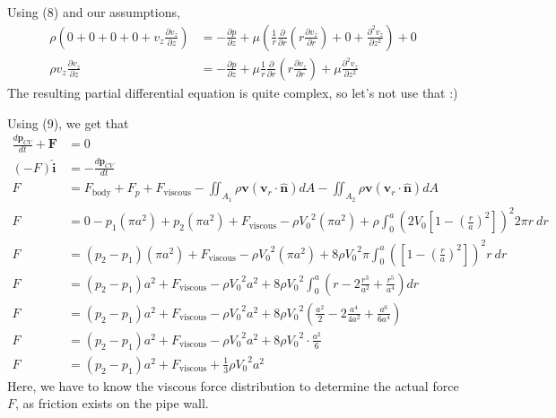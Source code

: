 \documentclass[10pt]{article}
\begin{document}
Using (8) and our assumptions,
\begin{align*}
    \rho\left(0 + 0 + 0 + 0 + v_z \frac{\partial v_z}{\partial z}\right) &= -\frac{\partial p}{\partial z} + \mu \left(\frac{1}{r} \frac{\partial}{\partial r} \left(r \frac{\partial v_z}{\partial r}\right) + 0 + \frac{\partial^2 v_z}{\partial z^2}\right) + 0 \\
    \rho v_z \frac{\partial v_z}{\partial z} &= -\frac{\partial p}{\partial z} + \mu \frac{1}{r} \frac{\partial}{\partial r} \left(r \frac{\partial v_z}{\partial r}\right) + \mu \frac{\partial^2 v_z}{\partial z^2}
\end{align*}
The resulting partial differential equation is quite complex, so let's not use that :)

Using (9), we get that
\begin{align*}
    \frac{d \mathbf{p}_{CV}}{dt} + \mathbf{F} &= 0 \\
    (-F)\mathbf{\hat{i}} &= -\frac{d \mathbf{p}_{CV}}{dt} \\
    F &= F_{\textrm{body}} + F_{p} + F_{\textrm{viscous}} -\iint_{A_{1}} \rho \mathbf{v}\left(\mathbf{v}_r \cdot \mathbf{\hat{n}}\right) dA -\iint_{A_{2}} \rho \mathbf{v}\left(\mathbf{v}_r \cdot \mathbf{\hat{n}}\right) dA \\
    F &= 0 - p_1 \left(\pi a^2\right) + p_2 \left(\pi a^2\right) + F_{\textrm{viscous}} - \rho {V_0}^2 \left(\pi a^2\right) + \rho \int_0^a \left(2V_0 \left[1 - \left(\frac{r}{a}\right)^2\right]\right)^2 2\pi r\ dr \\
    F &= \left(p_2 - p_1\right) \left(\pi a^2\right) + F_{\textrm{viscous}} - \rho {V_0}^2 \left(\pi a^2\right) + 8\rho {V_0}^2 \pi\int_0^a \left(\left[1 - \left(\frac{r}{a}\right)^2\right]\right)^2 r\ dr \\
    F &= \left(p_2 - p_1\right) a^2 + F_{\textrm{viscous}} - \rho {V_0}^2 a^2 + 8\rho {V_0}^2 \int_0^a \left(r - 2 \frac{r^3}{a^2} + \frac{r^5}{a^4}\right) dr \\
    F &= \left(p_2 - p_1\right) a^2 + F_{\textrm{viscous}} - \rho {V_0}^2 a^2 + 8\rho {V_0}^2 \left(\frac{a^2}{2} - 2 \frac{a^4}{4a^2} + \frac{a^6}{6a^4}\right) \\
    F &= \left(p_2 - p_1\right) a^2 + F_{\textrm{viscous}} - \rho {V_0}^2 a^2 + 8\rho {V_0}^2 \cdot \frac{a^2}{6} \\
    F &= \left(p_2 - p_1\right) a^2 + F_{\textrm{viscous}} + \frac{1}{3} \rho {V_0}^2 a^2
\end{align*}
Here, we have to know the viscous force distribution to determine the actual force $F$, as friction exists on the pipe wall.
\end{document}
